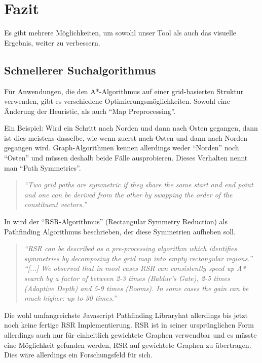 \documentclass[letterpaper]{article}
\begin{document}
\section{Fazit}
	Es gibt mehrere Möglichkeiten, um sowohl unser Tool als auch das visuelle Ergebnis, weiter zu verbessern.

	\subsection{Schnellerer Suchalgorithmus}
		Für Anwendungen, die den A*-Algorithmus auf einer grid-basierten Struktur verwenden, gibt es verschiedene Optimierungsmöglichkeiten. Sowohl eine Änderung der Heuristic, als auch "`Map Preprocessing"'.

		Ein Beispiel: Wird ein Schritt nach Norden und dann nach Osten gegangen, dann ist dies meistens dasselbe, wie wenn  zuerst nach Osten und dann nach Norden gegangen wird. Graph-Algorithmen kennen allerdings weder "`Norden"' noch "`Osten"' und müssen deshalb beide Fälle ausprobieren.\cite[vgl.]{patel16} Dieses Verhalten nennt man "`Path Symmetries"'.

		\begin{quote}
			\textit{"`Two grid paths are symmetric if they share the same start and end point and one can be derived from the other by swapping the order of the constituent vectors."'}\cite[p. 1]{harabor12}
		\end{quote}

		In \cite{harabor12} wird der "`RSR-Algorithmus"' (Rectangular Symmetry Reduction) als Pathfinding Algorithmus beschrieben, der diese Symmetrien aufheben soll.\\

		\begin{quote}
			\textit{"`RSR can be described as a pre-processing algorithm which identifies symmetries by decomposing the grid map into empty rectangular regions."'}\cite[p. 2]{harabor12}\\

			\textit{"`[...] We observed that in most cases RSR can consistently speed up A* search by a factor of between 2-3 times (Baldur's Gate), 2-5 times (Adaptive Depth) and 5-9 times (Rooms). In some cases the gain can be much higher: up to 30 times."'}\cite[p. 4]{harabor12}
		\end{quote}

		Die wohl umfangreichste Javascript Pathfinding Library\footnotemark hat allerdings bis jetzt noch keine fertige RSR Implementierung. RSR ist in seiner ursprünglichen Form allerdings auch nur für einheitlich gewichtete Graphen verwendbar und es müsste eine Möglichkeit gefunden werden, RSR auf gewichtete Graphen zu übertragen. Dies wäre allerdings ein Forschungsfeld für sich.
\end{document}
